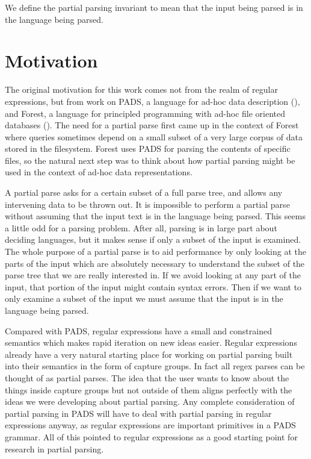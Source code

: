 We define the partial parsing invariant to mean that the
input being parsed is in the language being parsed.

\section{Motivation}

The original motivation for this work comes not from the realm of
regular expressions, but from work on PADS, a language for ad-hoc
data description (\cite{Fisher2005}), and Forest, a language for
principled programming with ad-hoc file oriented databases
(\cite{Fisher2011}). The need for a partial parse first
came up in the context of Forest where queries sometimes depend on
a small subset of a very large corpus of data stored in the filesystem.
Forest uses PADS for parsing the contents of specific files, so the
natural next step was to think about how partial parsing might
be used in the context of ad-hoc data representations.

A partial parse asks for a certain subset of a full parse tree,
and allows any intervening data to be thrown out. It is impossible
to perform a partial parse without assuming that the input text
is in the language being parsed. This seems a little odd for a
parsing problem. After all, parsing is in large part about deciding
languages, but it makes sense if only a subset of the input is
examined. The whole purpose of a partial parse
is to aid performance by only looking at the parts of the input which
are absolutely necessary to understand the subset of the parse tree
that we are really interested in. If we avoid looking at any part of
the input, that portion of the input might contain syntax errors.
Then if we want to only examine a subset of the input we must assume
that the input is in the language being parsed.

Compared with PADS, regular expressions have a small and
constrained semantics which makes rapid iteration on new
ideas easier. Regular expressions already have a very natural
starting place for working on partial parsing built into their
semantics in the form of capture groups. In fact all regex parses
can be thought of as partial parses. The idea that the user wants
to know about the things inside capture groups but not outside of
them aligns perfectly with the ideas we were developing about
partial parsing. Any complete consideration of partial
parsing in PADS will have to deal with partial parsing in regular
expressions anyway, as regular expressions are important primitives in
a PADS grammar. All of this pointed to regular expressions as a good
starting point for research in partial parsing.

